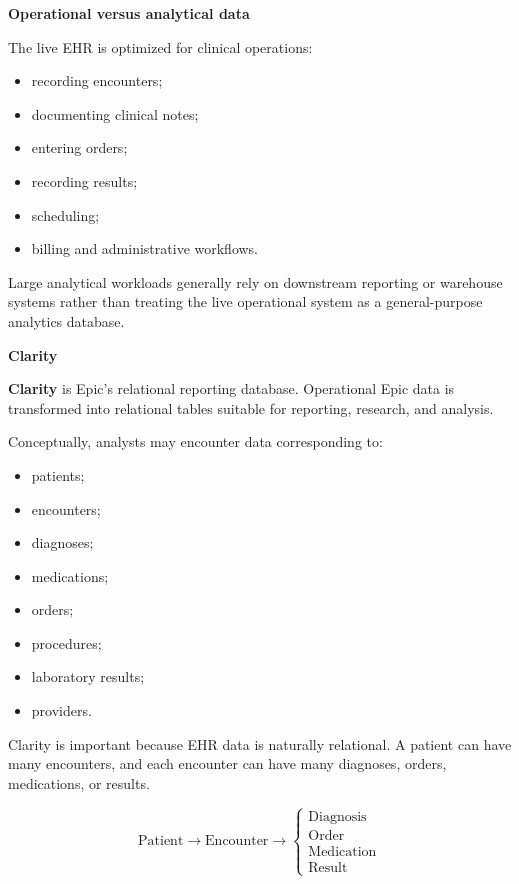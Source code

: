 \documentclass[11pt,letterpaper]{article}
\begin{document}
\textbf{Operational versus analytical data}

The live EHR is optimized for clinical operations:

\begin{itemize}[leftmargin=*]
    \item recording encounters;
    \item documenting clinical notes;
    \item entering orders;
    \item recording results;
    \item scheduling;
    \item billing and administrative workflows.
\end{itemize}

Large analytical workloads generally rely on downstream reporting or
warehouse systems rather than treating the live operational system as a
general-purpose analytics database.

\textbf{Clarity}

\textbf{Clarity} is Epic's relational reporting database. Operational Epic
data is transformed into relational tables suitable for reporting, research,
and analysis.

Conceptually, analysts may encounter data corresponding to:

\begin{itemize}[leftmargin=*]
    \item patients;
    \item encounters;
    \item diagnoses;
    \item medications;
    \item orders;
    \item procedures;
    \item laboratory results;
    \item providers.
\end{itemize}

Clarity is important because EHR data is naturally relational. A patient can
have many encounters, and each encounter can have many diagnoses, orders,
medications, or results.

\[
\text{Patient}
\rightarrow
\text{Encounter}
\rightarrow
\begin{cases}
\text{Diagnosis} \\
\text{Order} \\
\text{Medication} \\
\text{Result}
\end{cases}
\]
\end{document}
